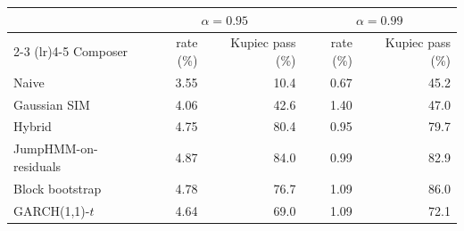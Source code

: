 \begin{tabular}{lrrrr}
\toprule
 & \multicolumn{2}{c}{$\alpha = 0.95$} & \multicolumn{2}{c}{$\alpha = 0.99$} \\
\cmidrule(lr){2-3} \cmidrule(lr){4-5}
Composer & rate (\%) & Kupiec pass (\%) & rate (\%) & Kupiec pass (\%) \\
\midrule
Naive                  & 3.55 & 10.4 & 0.67 & 45.2 \\
Gaussian SIM           & 4.06 & 42.6 & 1.40 & 47.0 \\
Hybrid                 & 4.75 & 80.4 & 0.95 & 79.7 \\
JumpHMM-on-residuals   & 4.87 & 84.0 & 0.99 & 82.9 \\
Block bootstrap        & 4.78 & 76.7 & 1.09 & 86.0 \\
GARCH(1,1)-$t$         & 4.64 & 69.0 & 1.09 & 72.1 \\
\bottomrule
\end{tabular}
